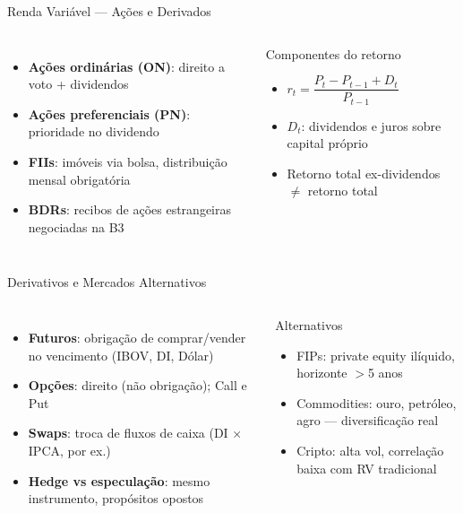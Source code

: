 \documentclass[aspectratio=169,12pt]{beamer}
\begin{document}
\begin{frame}[fragile]{Renda Variável — Ações e Derivados}
\begin{columns}[T]
\begin{itemize}
  \item \textbf{Ações ordinárias (ON)}: direito a voto + dividendos
  \item \textbf{Ações preferenciais (PN)}: prioridade no dividendo
  \item \textbf{FIIs}: imóveis via bolsa, distribuição mensal obrigatória
  \item \textbf{BDRs}: recibos de ações estrangeiras negociadas na B3
\end{itemize}
\begin{block}{Componentes do retorno}
\begin{itemize}
  \item $r_t = \dfrac{P_t - P_{t-1} + D_t}{P_{t-1}}$
  \item $D_t$: dividendos e juros sobre capital próprio
  \item Retorno total ex-dividendos $\neq$ retorno total
\end{itemize}
\end{block}
\end{columns}
\end{frame}

\begin{frame}[fragile]{Derivativos e Mercados Alternativos}
\begin{columns}[T]
\begin{itemize}
  \item \textbf{Futuros}: obrigação de comprar/vender no vencimento (IBOV, DI, Dólar)
  \item \textbf{Opções}: direito (não obrigação); Call e Put
  \item \textbf{Swaps}: troca de fluxos de caixa (DI $\times$ IPCA, por ex.)
  \item \textbf{Hedge vs especulação}: mesmo instrumento, propósitos opostos
\end{itemize}
\begin{block}{Alternativos}
\begin{itemize}
  \item FIPs: private equity ilíquido, horizonte $>$5 anos
  \item Commodities: ouro, petróleo, agro — diversificação real
  \item Cripto: alta vol, correlação baixa com RV tradicional
\end{itemize}
\end{block}
\end{columns}
\end{frame}
\end{document}
